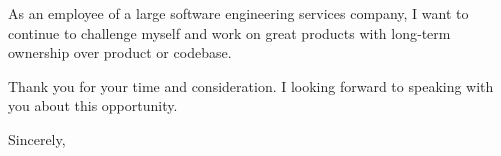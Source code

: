\documentclass[11pt, a4paper]{article}
\begin{document}
As an employee of a large software engineering services company, I want to continue to challenge myself and work on
great products with long‐term ownership over product or codebase.


Thank you for your time and consideration. I looking forward to speaking with you about this opportunity.

Sincerely,

\theauthor
\end{document}
